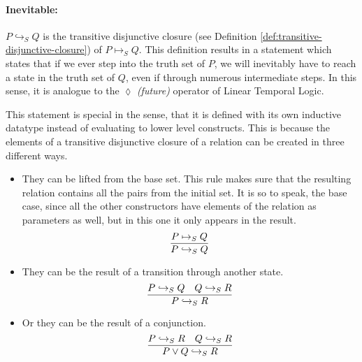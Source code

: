 \paragraph{Inevitable:}
$P \hookrightarrow_S Q$ is the transitive disjunctive closure (see Definition \ref{def:transitive-disjunctive-closure}) of $P \mapsto_S Q$. This definition results in a statement which states that if we ever step into the truth set of $P$, we will inevitably have to reach a state in the truth set of $Q$, even if through numerous intermediate steps. In this sense, it is analogue to the $\lozenge$ \textit{(future)} operator of Linear Temporal Logic.

This statement is special in the sense, that it is defined with its own inductive datatype instead of evaluating to lower level constructs. This is because the elements of a transitive disjunctive closure of a relation can be created in three different ways.

\begin{itemize}
    \item They can be lifted from the base set. This rule makes sure that the resulting relation contains all the pairs from the initial set. It is so to speak, the base case, since all the other constructors have elements of the relation as parameters as well, but in this one it only appears in the result.
    \begin{equation}
        \label{eq:leadsto-fromensures}
        \infer{P \hookrightarrow_S Q}{P \mapsto_S Q}
    \end{equation}

    \item They can be the result of a transition through another state.
    \begin{equation}
        \label{eq:leadsto-transitivity}
        \infer{P \hookrightarrow_S R}{P \hookrightarrow_S Q & Q \hookrightarrow_S R}
    \end{equation}

    \item Or they can be the result of a conjunction.
    \begin{equation}
        \label{eq:leadsto-disjunctivity}
        \infer{P \lor Q \hookrightarrow_S R}{P \hookrightarrow_S R & Q \hookrightarrow_S R}
    \end{equation}
\end{itemize}

